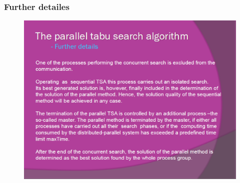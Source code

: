 \documentclass{beamer}
\begin{document}
\begin{frame}
\frametitle{Further detailes }
\begin{figure}[!th]
\begin{center}
\includegraphics[width=1\textwidth]{img/picn15.eps}
\end{center}
\end{figure}
\end{frame}
\end{document}
